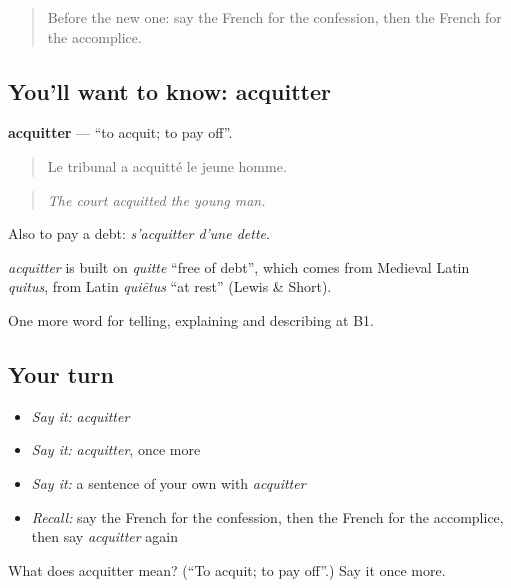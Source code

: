 \begin{quote}
Before the new one: say the French for the confession, then the French for the accomplice.
\end{quote}

\subsection*{You'll want to know: acquitter}
\textbf{acquitter} — \textquotedblleft{}to acquit; to pay off\textquotedblright{}.

\begin{quote}
Le tribunal a acquitté le jeune homme.
\end{quote}

\begin{quote}
\emph{The court acquitted the young man.}
\end{quote}

Also to pay a debt: \emph{s'acquitter d'une dette}.

\begin{cousinweb}
\emph{acquitter} is built on \emph{quitte} \textquotedblleft{}free of debt\textquotedblright{}, which comes from Medieval Latin \emph{quitus}, from Latin \emph{quiētus} \textquotedblleft{}at rest\textquotedblright{} (Lewis \& Short).
\end{cousinweb}

\begin{grammarlens}[title={What you've built}]
One more word for telling, explaining and describing at B1.
\end{grammarlens}

\subsection*{Your turn}
\begin{itemize}
\raggedright
  \item \emph{Say it:} \emph{acquitter}
  \item \emph{Say it:} \emph{acquitter}, once more
  \item \emph{Say it:} a sentence of your own with \emph{acquitter}
  \item \emph{Recall:} say the French for the confession, then the French for the accomplice, then say \emph{acquitter} again
\end{itemize}

\begin{tcolorbox}[breakable,colback=teal!4,colframe=teal!35!black,title={Before you move on}]
What does acquitter mean? (\textquotedblleft{}To acquit; to pay off\textquotedblright{}.) Say it once more.
\end{tcolorbox}
